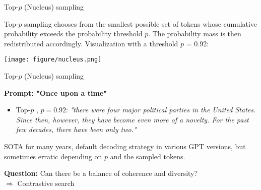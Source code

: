 
\begin{vbframe}{Top-$p$ (Nucleus) sampling }


Top-$p$ sampling chooses from the smallest possible set of tokens whose cumulative probability exceeds the probability threshold $p$. The probability mass is then redistributed accordingly.
Visualization with a threshold $p$ = 0.92:

\begin{center}
\texttt{[image: figure/nucleus.png]}
\end{center}

\end{vbframe}


\begin{vbframe}{Top-$p$ (Nucleus) sampling}

\vfill
\textbf{Prompt: "Once upon a time"}
\begin{itemize}
    \item Top-$p$ , $p = 0.92$: \textit{"there were four major political parties in the United States. Since then, however, they have become even more of a novelty. For the past few decades, there have been only two."}
\end{itemize}

\vspace{2ex}

SOTA for many years, default decoding strategy in various GPT versions, but sometimes erratic depending on $p$ and the sampled tokens.\\

\vspace{2ex}

\textbf{Question:} Can there be a balance of coherence and diversity?\\
$\Rightarrow$ Contrastive search
  
\end{vbframe}


